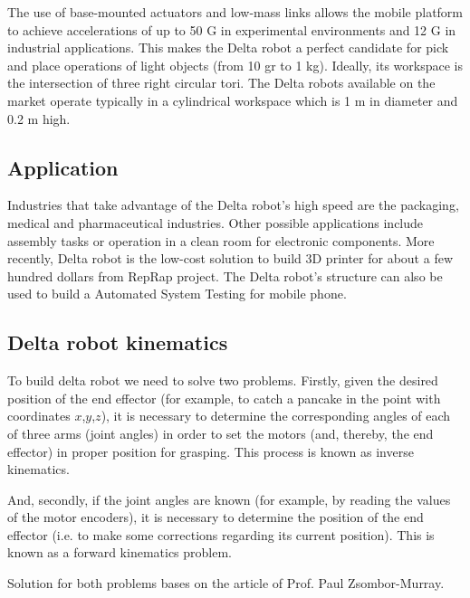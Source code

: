 The use of base-mounted actuators and low-mass links allows the mobile platform to achieve accelerations of up to 50 G in experimental environments and 12 G in industrial applications. This makes the Delta robot a perfect candidate for pick and place operations of light objects (from 10 gr to 1 kg). Ideally, its workspace is the intersection of three right circular tori. The Delta robots available on the market operate typically in a cylindrical workspace which is 1 m in diameter and 0.2 m high.

\subsection{Application}

Industries that take advantage of the Delta robot’s high speed are the packaging, medical and pharmaceutical industries. Other possible applications include assembly tasks or operation in a clean room for electronic components. More recently, Delta robot is the low-cost solution to build 3D printer for about a few hundred dollars from RepRap project\cite{reprap_thesis}. The Delta robot’s structure can also be used to build a Automated System Testing for mobile phone.

\subsection{Delta robot kinematics}

To build delta robot we need to solve two problems. Firstly, given the desired position of the end effector (for example, to catch a pancake in the point with coordinates $x$,$y$,$z$), it is necessary to determine the corresponding angles of each of three arms (joint angles) in order to set the motors (and, thereby, the end effector) in proper position for grasping. This process is known as inverse kinematics. 

And, secondly, if the joint angles are known (for example, by reading the values of the motor encoders), it is necessary to determine the position of the end effector (i.e. to make some corrections regarding its current position). This is known as a forward kinematics problem. 

Solution for both problems bases on the article of Prof. Paul Zsombor-Murray\cite{geometric_kinematic_analysis_thesis}. 

